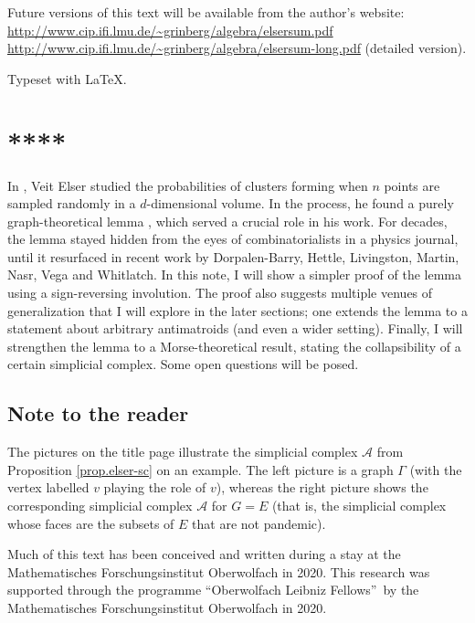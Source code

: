 \documentclass[numbers=enddot,12pt,final,onecolumn]{scrartcl}%
\theoremstyle{definition}
\newcommand\horiline{\noindent\makebox[\linewidth]{\rule{\textwidth}{1pt}} \newline}
\begin{document}
\horiline


\noindent Future versions of this text will be available from the
author's website: \newline%
\url{http://www.cip.ifi.lmu.de/~grinberg/algebra/elsersum.pdf} \newline%
\url{http://www.cip.ifi.lmu.de/~grinberg/algebra/elsersum-long.pdf} (detailed version).

\vspace{1pc}

\horiline


Typeset with \LaTeX.

\doclicenseThis


\section*{****}

In \cite{Elser84}, Veit Elser studied the probabilities of clusters forming
when $n$ points are sampled randomly in a $d$-dimensional volume. In the
process, he found a purely graph-theoretical lemma \cite[Lemma 1]{Elser84},
which served a crucial role in his work. For decades, the lemma stayed hidden
from the eyes of combinatorialists in a physics journal, until it resurfaced
in recent work \cite{DHLetc19} by Dorpalen-Barry, Hettle, Livingston, Martin,
Nasr, Vega and Whitlatch. In this note, I will show a simpler proof of the
lemma using a sign-reversing involution. The proof also suggests multiple
venues of generalization that I will explore in the later sections; one
extends the lemma to a statement about arbitrary antimatroids (and even a
wider setting). Finally, I will strengthen the lemma to a Morse-theoretical
result, stating the collapsibility of a certain simplicial complex. Some open
questions will be posed.

\subsection*{Note to the reader}

The pictures on the title page illustrate the simplicial complex $\mathcal{A}$
from Proposition \ref{prop.elser-sc} on an example. The left picture is a
graph $\Gamma$ (with the vertex labelled $v$ playing the role of $v$), whereas
the right picture shows the corresponding simplicial complex $\mathcal{A}$ for
$G=E$ (that is, the simplicial complex whose faces are the subsets of $E$ that
are not pandemic).

Much of this text has been conceived and written during a stay at the
Mathematisches Forschungsinstitut Oberwolfach in 2020. This research was
supported through the programme \textquotedblleft Oberwolfach Leibniz
Fellows\textquotedblright\ by the Mathematisches Forschungsinstitut
Oberwolfach in 2020.
\end{document}
